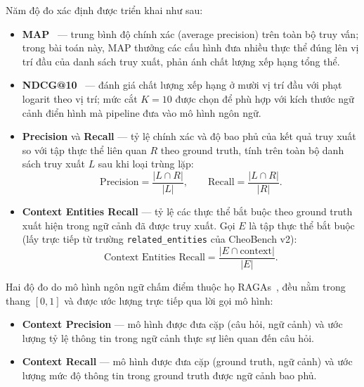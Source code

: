 Năm độ đo xác định được triển khai như sau:

\begin{itemize}
  \item \textbf{MAP}~\cite{manning2008ir} --- trung bình độ chính xác (average precision) trên toàn bộ truy vấn; trong bài toán này, MAP thưởng các cấu hình đưa nhiều thực thể đúng lên vị trí đầu của danh sách truy xuất, phản ánh chất lượng xếp hạng tổng thể.

  \item \textbf{NDCG@10}~\cite{jarvelin2002ndcg} --- đánh giá chất lượng xếp hạng ở mười vị trí đầu với phạt logarit theo vị trí; mức cắt $K = 10$ được chọn để phù hợp với kích thước ngữ cảnh điển hình mà pipeline đưa vào mô hình ngôn ngữ.

  \item \textbf{Precision} và \textbf{Recall} --- tỷ lệ chính xác và độ bao phủ của kết quả truy xuất so với tập thực thể liên quan $R$ theo ground truth, tính trên toàn bộ danh sách truy xuất $L$ sau khi loại trùng lặp:
    \begin{equation}
      \text{Precision} = \frac{|L \cap R|}{|L|}, \qquad \text{Recall} = \frac{|L \cap R|}{|R|}.
    \end{equation}

  \item \textbf{Context Entities Recall} --- tỷ lệ các thực thể bắt buộc theo ground truth xuất hiện trong ngữ cảnh đã được truy xuất. Gọi $E$ là tập thực thể bắt buộc (lấy trực tiếp từ trường \texttt{related\_entities} của CheoBench v2):
    \begin{equation}
      \text{Context Entities Recall} = \frac{|E \cap \text{context}|}{|E|}.
    \end{equation}
\end{itemize}

Hai độ đo do mô hình ngôn ngữ chấm điểm thuộc họ RAGAs~\cite{es2023ragas}, đều nằm trong thang $[0, 1]$ và được ước lượng trực tiếp qua lời gọi mô hình:

\begin{itemize}
  \item \textbf{Context Precision} --- mô hình được đưa cặp (câu hỏi, ngữ cảnh) và ước lượng tỷ lệ thông tin trong ngữ cảnh thực sự liên quan đến câu hỏi.

  \item \textbf{Context Recall} --- mô hình được đưa cặp (ground truth, ngữ cảnh) và ước lượng mức độ thông tin trong ground truth được ngữ cảnh bao phủ.
\end{itemize}

